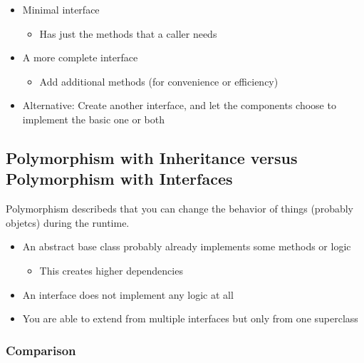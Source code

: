 \begin{itemize}
\tightlist
\item
  Minimal interface

  \begin{itemize}
  \tightlist
  \item
    Has just the methods that a caller needs
  \end{itemize}
\item
  A more complete interface

  \begin{itemize}
  \tightlist
  \item
    Add additional methods (for convenience or efficiency)
  \end{itemize}
\item
  Alternative: Create another interface, and let the components choose
  to implement the basic one or both
\end{itemize}

\hypertarget{polymorphism-with-inheritance-versus-polymorphism-with-interfaces}{%
\subsection{Polymorphism with Inheritance versus Polymorphism with
Interfaces}\label{polymorphism-with-inheritance-versus-polymorphism-with-interfaces}}

Polymorphism describeds that you can change the behavior of things
(probably objetcs) during the runtime.

\begin{itemize}
\tightlist
\item
  An abstract base class probably already implements some methods or
  logic

  \begin{itemize}
  \tightlist
  \item
    This creates higher dependencies
  \end{itemize}
\item
  An interface does not implement any logic at all
\item
  You are able to extend from multiple interfaces but only from one
  superclass
\end{itemize}

\hypertarget{comparison}{%
\subsubsection{Comparison}\label{comparison}}

